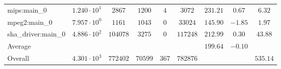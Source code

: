 \begin{tabular}{|l|c|c|c|c|c|c|c|c|}
mips:main\_0            & $ 1.240 \cdot 10^{1}  $ & $ 2867   $ & $ 1200  $ & $ 4   $ & $ 3072   $ & $ 231.21      $ & $ 0.67    $ & $ 6.32    $ \\
mpeg2:main\_0           & $ 7.957 \cdot 10^{0}  $ & $ 1161   $ & $ 1043  $ & $ 0   $ & $ 33024  $ & $ 145.90      $ & $ -1.85   $ & $ 1.97    $ \\
sha\_driver:main\_0     & $ 4.886 \cdot 10^{2}  $ & $ 104078 $ & $ 3275  $ & $ 0   $ & $ 117248 $ & $ 212.99      $ & $ 0.30    $ & $ 43.88   $ \\
\hline
Average                 & $                     $ & $        $ & $       $ & $     $ & $        $ & $ 199.64      $ & $ -0.10   $ & $         $ \\
\hline
Overall                 & $ 4.301 \cdot 10^{3}  $ & $ 772402 $ & $ 70599 $ & $ 367 $ & $ 782876 $ & $             $ & $         $ & $ 535.14  $ \\
\hline
\end{tabular}
